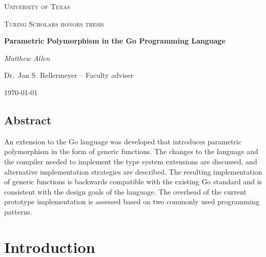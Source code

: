 \documentclass[letterpaper,11pt]{article}
\begin{document}
\begin{titlepage}
	\centering
	{\scshape\LARGE University of Texas \par}
	\vspace{1cm}
	{\scshape\Large Turing Scholars honors thesis\par}
	\vspace{1.5cm}
	{\huge\bfseries Parametric Polymorphism in the Go Programming Language\par}
	\vspace{2cm}
	{\Large\itshape Matthew Allen\par}
	\vfill
	Dr.~Jan S. Rellermeyer -- Faculty adviser

	\vfill

	{\large \today\par}
\end{titlepage}

\thispagestyle{empty}


\subsection*{Abstract}
An extension to the Go language was developed that introduces parametric polymorphism in the form of generic functions. The changes to the language and the compiler needed to implement the type system extensions are discussed, and alternative implementation strategies are described. The resulting implementation of generic functions is backwards compatible with the existing Go standard and is consistent with the design goals of the language. The overhead of the current prototype implementation is assessed based on two commonly used programming patterns. 

\section{Introduction} \label{introduction}
\end{document}
